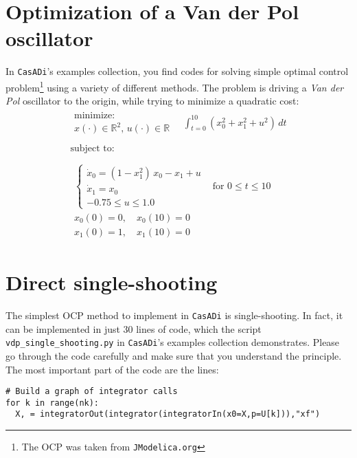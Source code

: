 \documentclass[a4paper,12pt]{book}
\newcommand{\CasADi}{\texttt{CasADi}\xspace}
\begin{document}
\section{Optimization of a Van der Pol oscillator}
In \CasADi's examples collection, you find codes for solving simple optimal control problem\footnote{The OCP was taken from \texttt{JModelica.org}} using a variety of different methods. The problem is driving a \emph{Van der Pol} oscillator to the origin, while trying to minimize a quadratic cost:
\begin{equation}
\begin{array}{lc}
\begin{array}{l}
\text{minimize:} \\
x(\cdot) \in \mathbb{R}^2, \, u(\cdot) \in \mathbb{R}
\end{array}
\quad \displaystyle \int_{t=0}^{10}{(x_0^2 + x_1^2 + u^2) \, dt}
\\
\\
\text{subject to:} \\
\\
\begin{array}{ll}
\left\{
\begin{array}{l}
\dot{x}_0 = (1-x_1^2) \, x_0 - x_1 + u \\
\dot{x}_1 = x_0 \\
-0.75 \le u \le 1.0
\end{array} \right. & \text{for $0 \le t \le 10$} \\
x_0(0)=0, \quad x_0(10)=0  \\
x_1(0)=1, \quad x_1(10)=0  
\end{array}
\end{array}
\label{eq:vdp}
\end{equation}

\section{Direct single-shooting}
The simplest OCP method to implement in \CasADi is single-shooting. In fact, it can be implemented in just 30 lines of code, which the script {\texttt{vdp\_single\_shooting.py}} in \CasADi's examples collection demonstrates. Please go through the code carefully and make sure that you understand the principle. The most important part of the code are the lines:
\begin{verbatim}
# Build a graph of integrator calls
for k in range(nk):
  X, = integratorOut(integrator(integratorIn(x0=X,p=U[k])),"xf")
\end{verbatim}
\end{document}
